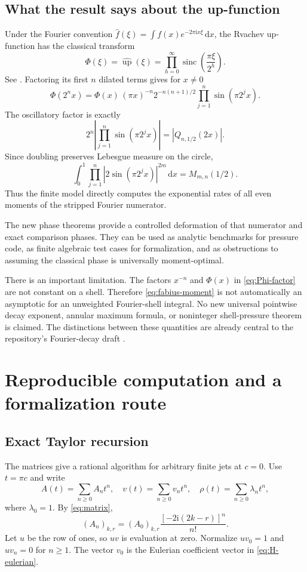 \documentclass[11pt,a4paper]{article}
\numberwithin{equation}{section}
\theoremstyle{definition}
\theoremstyle{remark}
\newcommand{\ii}{\mathrm i}
\newcommand{\dd}{\,\mathrm d}
\newcommand{\sinc}{\operatorname{sinc}}
\begin{document}
\subsection{What the result says about the up-function}
Under the Fourier convention
$\widehat f(\xi)=\int f(x)e^{-2\pi\ii x\xi}\dd x$, the Rvachev
up-function has the classical transform
\begin{equation}
 \Phi(\xi)=\widehat{\operatorname{up}}(\xi)
 =\prod_{h=0}^{\infty}\sinc\!\left(\frac{\pi\xi}{2^h}\right).
 \label{eq:Phi}
\end{equation}
See \cite{Arias,RepoFourier}. Factoring its first $n$ dilated terms gives
for $x\neq0$
\begin{equation}
 \Phi(2^nx)=\Phi(x)\,(\pi x)^{-n}2^{-n(n+1)/2}
 \prod_{j=1}^n\sin(\pi2^jx).
 \label{eq:Phi-factor}
\end{equation}
The oscillatory factor is exactly
\[
 2^n\left|\prod_{j=1}^n\sin(\pi2^jx)\right|
 =|Q_{n,1/2}(2x)|.
\]
Since doubling preserves Lebesgue measure on the circle,
\begin{equation}
 \int_0^1\prod_{j=1}^n|2\sin(\pi2^jx)|^{2m}\dd x
 =M_{m,n}(1/2).
 \label{eq:fabius-moment}
\end{equation}
Thus the finite model directly computes the exponential rates of all
even moments of the stripped Fourier numerator.

The new phase theorems provide a controlled deformation of that
numerator and exact comparison phases. They can be used as analytic
benchmarks for pressure code, as finite algebraic test cases for
formalization, and as obstructions to assuming the classical phase is
universally moment-optimal.

There is an important limitation. The factors $x^{-n}$ and $\Phi(x)$ in
\cref{eq:Phi-factor} are not constant on a shell. Therefore
\cref{eq:fabius-moment} is not automatically an asymptotic for an
unweighted Fourier-shell integral. No new universal pointwise decay
exponent, annular maximum formula, or noninteger shell-pressure theorem
is claimed. The distinctions between these quantities are already
central to the repository's Fourier-decay draft \cite{RepoFourier}.

\section{Reproducible computation and a formalization route}
\label{sec:verification}

\subsection{Exact Taylor recursion}
The matrices give a rational algorithm for arbitrary finite jets at
$c=0$. Use $t=\pi c$ and write
\[
 A(t)=\sum_{n\geq0}A_nt^n,\quad
 v(t)=\sum_{n\geq0}v_nt^n,\quad
 \rho(t)=\sum_{n\geq0}\lambda_nt^n,
\]
where $\lambda_0=1$. By \cref{eq:matrix},
\begin{equation}
 (A_n)_{k,r}=(A_0)_{k,r}\frac{[-2\ii(2k-r)]^n}{n!}.
 \label{eq:An}
\end{equation}
Let $u$ be the row of ones, so $uv$ is evaluation at zero. Normalize
$uv_0=1$ and $uv_n=0$ for $n\geq1$. The vector $v_0$ is the
Eulerian coefficient vector in \cref{eq:H-eulerian}.
\end{document}
